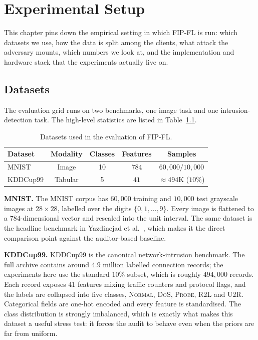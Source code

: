 \chapter{Experimental Setup}
\label{Setup:chap:chap6}
\graphicspath{{15.Chapter6/Images/}}

This chapter pins down the empirical setting in which FIP-FL is run: which datasets we use, how the data is split among the clients, what attack the adversary mounts, which numbers we look at, and the implementation and hardware stack that the experiments actually live on.

\section{Datasets}
\label{sec:setup-datasets}

The evaluation grid runs on two benchmarks, one image task and one intrusion-detection task. The high-level statistics are listed in Table~\ref{tab:datasets}.

\begin{table}[H]
\centering
\caption{Datasets used in the evaluation of FIP-FL.}
\label{tab:datasets}
\begin{tabular}{@{}lcccc@{}}
\toprule
\textbf{Dataset} & \textbf{Modality} & \textbf{Classes} & \textbf{Features} & \textbf{Samples} \\
\midrule
MNIST           & Image   & 10 & $784$ & $60{,}000 / 10{,}000$ \\
KDDCup99        & Tabular & 5  & $41$  & $\approx 494$K ($10\%$) \\
\bottomrule
\end{tabular}
\end{table}

\noindent\textbf{MNIST.} The MNIST corpus has $60{,}000$ training and $10{,}000$ test grayscale images at $28\times28$, labelled over the digits $\{0,1,\ldots,9\}$. Every image is flattened to a $784$-dimensional vector and rescaled into the unit interval. The same dataset is the headline benchmark in Yazdinejad et al.~\cite{yazdinejad2024robust}, which makes it the direct comparison point against the auditor-based baseline.

\noindent\textbf{KDDCup99.} KDDCup99 is the canonical network-intrusion benchmark. The full archive contains around $4.9$ million labelled connection records; the experiments here use the standard $10\%$ subset, which is roughly $494{,}000$ records. Each record exposes $41$ features mixing traffic counters and protocol flags, and the labels are collapsed into five classes, \textsc{Normal}, \textsc{DoS}, \textsc{Probe}, \textsc{R2L} and \textsc{U2R}. Categorical fields are one-hot encoded and every feature is standardised. The class distribution is strongly imbalanced, which is exactly what makes this dataset a useful stress test: it forces the audit to behave even when the priors are far from uniform.

